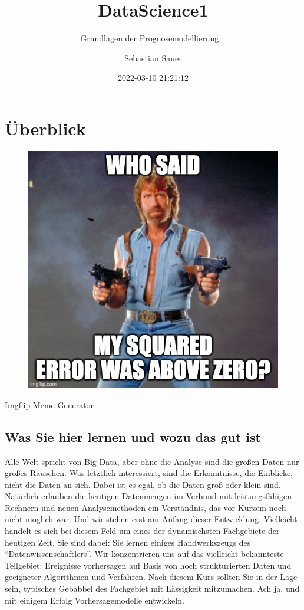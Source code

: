 \documentclass[
]{book}
\title{DataScience1}
\subtitle{Grundlagen der Prognosemodellierung 🔮🧰}
\author{Sebastian Sauer}
\date{2022-03-10 21:21:12}
\begin{document}
\maketitle

{
\setcounter{tocdepth}{1}
\tableofcontents
}
\hypertarget{uxfcberblick}{%
\chapter{Überblick}\label{uxfcberblick}}

\begin{figure}[H]

{\centering \includegraphics[width=0.5\linewidth]{img/662upp} 

}

\end{figure}

\href{https://imgflip.com/i/662upp}{Imgflip Meme Generator}

\hypertarget{was-sie-hier-lernen-und-wozu-das-gut-ist}{%
\section{Was Sie hier lernen und wozu das gut ist}\label{was-sie-hier-lernen-und-wozu-das-gut-ist}}

Alle Welt spricht von Big Data, aber ohne die Analyse sind die großen Daten nur großes Rauschen. Was letztlich interessiert, sind die Erkenntnisse, die Einblicke, nicht die Daten an sich.
Dabei ist es egal, ob die Daten groß oder klein sind.
Natürlich erlauben die heutigen Datenmengen im Verbund mit leistungsfähigen Rechnern und neuen Analysemethoden ein Verständnis,
das vor Kurzem noch nicht möglich war.
Und wir stehen erst am Anfang dieser Entwicklung.
Vielleicht handelt es sich bei diesem Feld um eines der dynamischsten Fachgebiete der heutigen Zeit.
Sie sind dabei: Sie lernen einiges Handwerkszeugs des ``Datenwissenschaftlers''.
Wir konzentrieren uns auf das vielleicht bekannteste Teilgebiet:
Ereignisse vorhersagen auf Basis von hoch strukturierten Daten
und geeigneter Algorithmen und Verfahren.
Nach diesem Kurs sollten Sie in der Lage sein,
typisches Gebabbel des Fachgebiet mit Lässigkeit mitzumachen.
Ach ja, und mit einigem Erfolg Vorhersagemodelle entwickeln.
\end{document}
